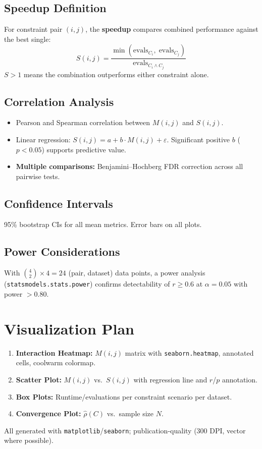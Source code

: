 \documentclass[11pt,a4paper]{article}
\begin{document}
\subsection{Speedup Definition}
For constraint pair $(i,j)$, the \textbf{speedup} compares combined performance against the best single:
\begin{equation}
  \boxed{S(i,j) = \frac{\min(\text{evals}_{C_i},\; \text{evals}_{C_j})}{\text{evals}_{C_i \wedge C_j}}}
  \label{eq:speedup}
\end{equation}
$S > 1$ means the combination outperforms either constraint alone.

\subsection{Correlation Analysis}
\begin{itemize}
  \item Pearson and Spearman correlation between $M(i,j)$ and $S(i,j)$.
  \item Linear regression: $S(i,j) = a + b \cdot M(i,j) + \varepsilon$. Significant positive $b$ ($p < 0.05$) supports predictive value.
  \item \textbf{Multiple comparisons:} Benjamini--Hochberg FDR correction across all pairwise tests.
\end{itemize}

\subsection{Confidence Intervals}
95\% bootstrap CIs for all mean metrics. Error bars on all plots.

\subsection{Power Considerations}
With $\binom{4}{2} \times 4 = 24$ (pair, dataset) data points, a power analysis (\texttt{statsmodels.stats.power}) confirms detectability of $r \ge 0.6$ at $\alpha = 0.05$ with power $> 0.80$.

\section{Visualization Plan}
\label{sec:viz}
\begin{enumerate}
  \item \textbf{Interaction Heatmap:} $M(i,j)$ matrix with \texttt{seaborn.heatmap}, annotated cells, coolwarm colormap.
  \item \textbf{Scatter Plot:} $M(i,j)$ vs.\ $S(i,j)$ with regression line and $r$/$p$ annotation.
  \item \textbf{Box Plots:} Runtime/evaluations per constraint scenario per dataset.
  \item \textbf{Convergence Plot:} $\hat{\rho}(C)$ vs.\ sample size $N$.
\end{enumerate}
All generated with \texttt{matplotlib}/\texttt{seaborn}; publication-quality (300 DPI, vector where possible).
\end{document}
